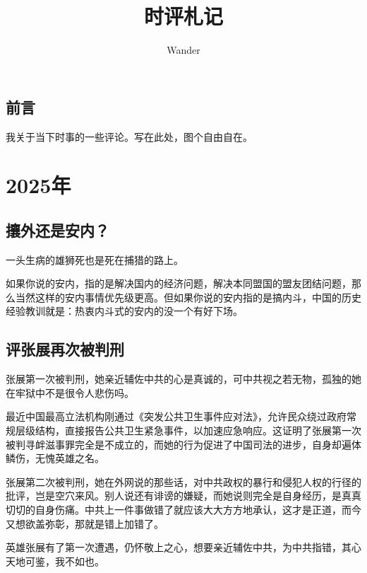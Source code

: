 \documentclass[12pt,oneside]{book}
\title{时评札记}
\author{Wander}
\begin{document}
\makemytitle



\frontmatter 
{}
\chapter*{前言}
我关于当下时事的一些评论。写在此处，图个自由自在。



\setcounter{tocdepth}{2}    
\tableofcontents


\mainmatter


\part{2025年}

\chapter{攘外还是安内？}
一头生病的雄狮死也是死在捕猎的路上。

如果你说的安内，指的是解决国内的经济问题，解决本同盟国的盟友团结问题，那么当然这样的安内事情优先级更高。但如果你说的安内指的是搞内斗，中国的历史经验教训就是：热衷内斗式的安内的没一个有好下场。


\chapter{评张展再次被判刑}
张展第一次被判刑，她亲近辅佐中共的心是真诚的，可中共视之若无物，孤独的她在牢狱中不是很令人悲伤吗。

最近中国最高立法机构刚通过《突发公共卫生事件应对法》，允许民众绕过政府常规层级结构，直接报告公共卫生紧急事件，以加速应急响应。这证明了张展第一次被判寻衅滋事罪完全是不成立的，而她的行为促进了中国司法的进步，自身却遍体鳞伤，无愧英雄之名。

张展第二次被判刑，她在外网说的那些话，对中共政权的暴行和侵犯人权的行径的批评，岂是空穴来风。别人说还有诽谤的嫌疑，而她说则完全是自身经历，是真真切切的自身伤痛。中共上一件事做错了就应该大大方方地承认，这才是正道，而今又想欲盖弥彰，那就是错上加错了。

英雄张展有了第一次遭遇，仍怀敬上之心，想要亲近辅佐中共，为中共指错，其心天地可鉴，我不如也。
\end{document}
